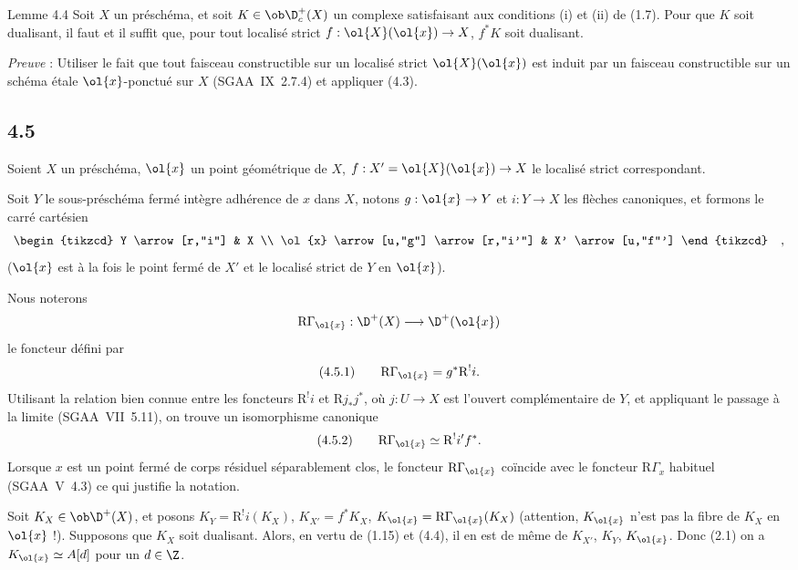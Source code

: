 \begin{statement}{Lemme 4.4}
Soit $X$ un préschéma, et soit $K\in\ob\D_c^+(X)$ un complexe satisfaisant aux conditions (i) et (ii) de (1.7). Pour que $K$ soit dualisant, il faut et il suffit que, pour tout localisé strict $f:\ol{X}(\ol{x})\to X$, $f^*K$ soit dualisant.
\end{statement}

\emph{Preuve} : Utiliser le fait que tout faisceau constructible sur un localisé strict $\ol{X}(\ol{x})$ est induit par un faisceau constructible sur un schéma étale $\ol{x}$-ponctué sur $X$ (SGAA~IX~2.7.4) et appliquer (4.3).

\subsection*{4.5}
Soient $X$ un préschéma, $\ol{x}$ un point géométrique de $X$, $f:X'=\ol{X}(\ol{x})\to X$ le localisé strict correspondant.

Soit $Y$ le sous-préschéma fermé intègre adhérence de $x$ dans $X$, notons $g:\ol{x}\to Y$ et $i:Y\to X$ les flèches canoniques, et formons le carré cartésien
\[
\begin{tikzcd}
Y \arrow[r,"i"] & X \\
\ol{x} \arrow[u,"g"] \arrow[r,"i'"] & X' \arrow[u,"f"']
\end{tikzcd}\quad ,
\]
($\ol{x}$ est à la fois le point fermé de $X'$ et le localisé strict de $Y$ en $\ol{x}$).

Nous noterons
\[
\mathrm{R}\Gamma_{\ol{x}}:\D^+(X)\longrightarrow \D^+(\ol{x})
\]
le foncteur défini par
\[
(4.5.1)\qquad \mathrm{R}\Gamma_{\ol{x}}=g^*\mathrm{R}^{!}i.
\]
Utilisant la relation bien connue entre les foncteurs $\mathrm{R}^{!}i$ et $\mathrm{R} j_*j^*$, où $j:U\to X$ est l'ouvert complémentaire de $Y$, et appliquant le passage à la limite (SGAA~VII~5.11), on trouve un isomorphisme canonique
\[
(4.5.2)\qquad \mathrm{R}\Gamma_{\ol{x}}\simeq\mathrm{R}^{!}i' f^*.
\]
Lorsque $x$ est un point fermé de corps résiduel séparablement clos, le foncteur $\mathrm{R}\Gamma_{\ol{x}}$ coïncide avec le foncteur $\mathrm{R}\Gamma_x$ habituel (SGAA~V~4.3) ce qui justifie la notation.

Soit $K_X\in\ob\D^+(X)$, et posons $K_Y=\mathrm{R}^{!}i(K_X)$, $K_{X'}=f^*K_X$, $K_{\ol{x}}=\mathrm{R}\Gamma_{\ol{x}}(K_X)$ (attention, $K_{\ol{x}}$ n'est pas la fibre de $K_X$ en $\ol{x}$ !). Supposons que $K_X$ soit dualisant. Alors, en vertu de (1.15) et (4.4), il en est de même de $K_{X'}$, $K_Y$, $K_{\ol{x}}$. Donc (2.1) on a $K_{\ol{x}}\simeq A[d]$ pour un $d\in\Z$.

